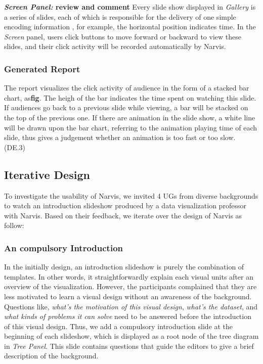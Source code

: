 \textbf{\textit{Screen Panel:}  review and comment}
Every slide show  displayed in \textit{Gallery}  is a series of slides, each of which is responsible for the delivery of one simple encoding information , for example, the horizontal position indicates time. In the \textit{Screen} panel, users click buttons to move forward or backward to view these slides, and their click activity will be recorded automatically by Narvis. 

\subsubsection{Generated Report}
The report visualizes the click activity of audience in the form of a stacked bar chart, as\textbf{fig}. The heigh of the bar indicates the time spent on watching this slide. If audiences go back to a previous slide while viewing, a bar will be stacked on the top of the previous one. If there are animation in the slide show, a white line will be drawn upon the bar chart, referring to the animation playing time of each slide, thus gives a judgement whether an animation is too fast or too slow. (DE.3)

\subsection{Iterative Design}
To investigate the usability of Narvis, we invited 4 UGs  from diverse backgrounds to watch an introduction slideshow produced by a data visualization professor with Narvis. 
Based on their feedback, we iterate over the design of Narvis as follow:

\subsubsection{An compulsory Introduction}
In the initially design, an introduction slideshow is purely the combination of templates. In other words, it straightforwardly  explain each visual units after an overview of the visualization. However, the participants complained that they are less motivated to learn a visual design without an awareness of the background. Questions like, \textit{what's the motivation of this visual design}, \textit{what's the dataset}, and \textit{what kinds of problems it can solve} need to be answered before the introduction of this visual design. Thus, we add a compulsory introduction slide at the beginning of each slideshow, which is displayed as a root node of the tree diagram in \textit{Tree Panel}. This slide contains questions that guide the editors to give a brief description of the background.
